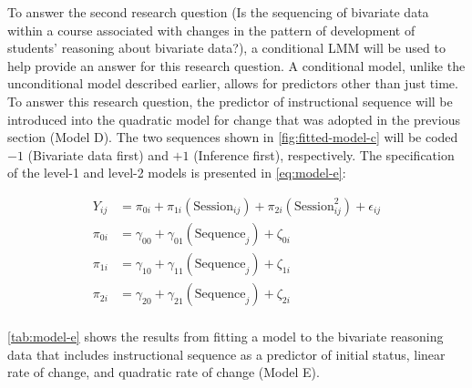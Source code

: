 \documentclass[11pt]{umnthesis}
\begin{document}
To answer the second research question (Is the sequencing of bivariate data within a course associated with changes in the pattern of development of students' reasoning about bivariate data?), a conditional LMM will be used to help provide an answer for this research question. A conditional model, unlike the unconditional model described earlier, allows for predictors other than just time. To answer this research question, the predictor of instructional sequence will be introduced into the quadratic model for change that was adopted in the previous section (Model D). The two sequences shown in \ref{fig:fitted-model-c} will be coded \(-1\) (Bivariate data first) and \(+1\) (Inference first), respectively. The specification of the level-1 and level-2 models is presented in \autoref{eq:model-e}:

\begin{equation}\label{eq:model-e}
\begin{split}
Y_{ij} &= \pi_{0i} + \pi_{1i}(\mathrm{Session}_{ij}) + \pi_{2i}(\mathrm{Session}_{ij}^2) + \epsilon_{ij}\\[2ex]
\pi_{0i} &= \gamma_{00} + \gamma_{01}(\mathrm{Sequence}_{j}) + \zeta_{0i}\\[1ex]
\pi_{1i} &= \gamma_{10} + \gamma_{11}(\mathrm{Sequence}_{j}) + \zeta_{1i}\\[1ex]
\pi_{2i} &= \gamma_{20} + \gamma_{21}(\mathrm{Sequence}_{j}) + \zeta_{2i}\\[1ex]
\end{split}
\end{equation}

\ref{tab:model-e} shows the results from fitting a model to the bivariate reasoning data that includes instructional sequence as a predictor of initial status, linear rate of change, and quadratic rate of change (Model E).
\end{document}
